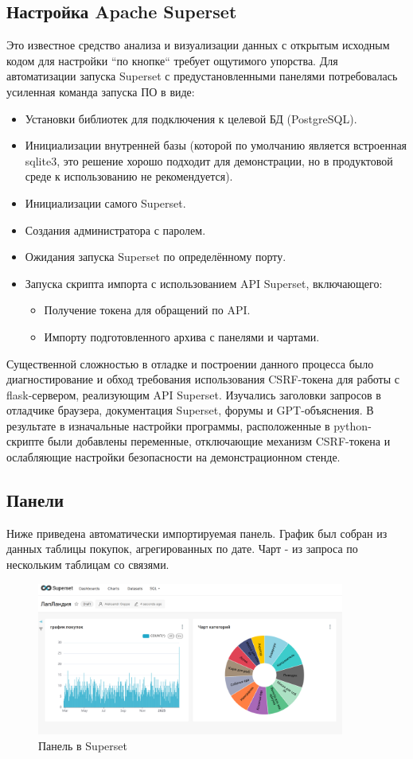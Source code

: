 \subsection{Настройка Apache Superset}\label{subsec:-apache-superset}
Это известное средство анализа и визуализации данных с открытым исходным кодом для настройки ``по кнопке``
требует ощутимого упорства.
Для автоматизации запуска Superset с предустановленными панелями потребовалась усиленная команда запуска ПО в виде:
\begin{itemize}
    \item Установки библиотек для подключения к целевой БД (PostgreSQL).
    \item Инициализации внутренней базы (которой по умолчанию является
    встроенная sqlite3, это решение хорошо подходит для демонстрации, но в продуктовой среде к использованию не
    рекомендуется).
    \item Инициализации самого Superset.
    \item Создания администратора с паролем.
    \item Ожидания запуска Superset по определённому порту.
    \item Запуска скрипта импорта с использованием API Superset, включающего:
    \begin{itemize}
        \item Получение токена для обращений по API\@.
        \item Импорту подготовленного архива с панелями и чартами.
    \end{itemize}
\end{itemize}

Существенной сложностью в отладке и построении данного процесса было диагностирование и обход требования
использования CSRF-токена для работы с flask-сервером, реализующим API Superset.
Изучались заголовки запросов в отладчике браузера, документация Superset, форумы и GPT-объяснения.
В результате в изначальные настройки программы, расположенные в python-скрипте были добавлены переменные,
отключающие механизм CSRF-токена и ослабляющие настройки безопасности на демонстрационном стенде.

\subsection{Панели}\label{subsec:supersetpanels}

Ниже приведена автоматически импортируемая панель.
График был собран из данных таблицы покупок, агрегированных по дате.
Чарт - из запроса по нескольким таблицам со связями.

\begin{figure}[htbp]
    \centering
    \includegraphics[width=0.9\textwidth]{superset} %
    \caption{Панель в Superset}\label{fig:supersetpic}
\end{figure}